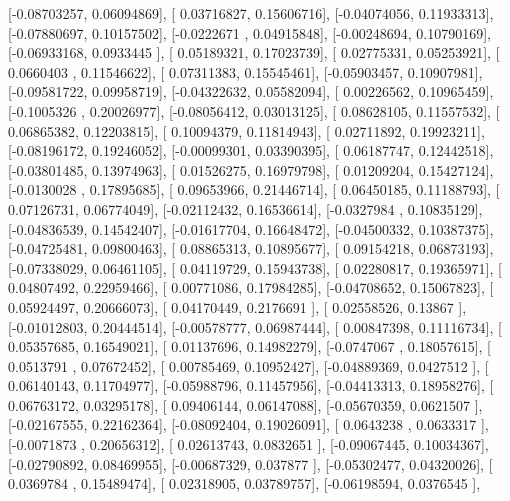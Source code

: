 \documentclass{article}
\begin{document}
       [-0.08703257,  0.06094869],
       [ 0.03716827,  0.15606716],
       [-0.04074056,  0.11933313],
       [-0.07880697,  0.10157502],
       [-0.0222671 ,  0.04915848],
       [-0.00248694,  0.10790169],
       [-0.06933168,  0.0933445 ],
       [ 0.05189321,  0.17023739],
       [ 0.02775331,  0.05253921],
       [ 0.0660403 ,  0.11546622],
       [ 0.07311383,  0.15545461],
       [-0.05903457,  0.10907981],
       [-0.09581722,  0.09958719],
       [-0.04322632,  0.05582094],
       [ 0.00226562,  0.10965459],
       [-0.1005326 ,  0.20026977],
       [-0.08056412,  0.03013125],
       [ 0.08628105,  0.11557532],
       [ 0.06865382,  0.12203815],
       [ 0.10094379,  0.11814943],
       [ 0.02711892,  0.19923211],
       [-0.08196172,  0.19246052],
       [-0.00099301,  0.03390395],
       [ 0.06187747,  0.12442518],
       [-0.03801485,  0.13974963],
       [ 0.01526275,  0.16979798],
       [ 0.01209204,  0.15427124],
       [-0.0130028 ,  0.17895685],
       [ 0.09653966,  0.21446714],
       [ 0.06450185,  0.11188793],
       [ 0.07126731,  0.06774049],
       [-0.02112432,  0.16536614],
       [-0.0327984 ,  0.10835129],
       [-0.04836539,  0.14542407],
       [-0.01617704,  0.16648472],
       [-0.04500332,  0.10387375],
       [-0.04725481,  0.09800463],
       [ 0.08865313,  0.10895677],
       [ 0.09154218,  0.06873193],
       [-0.07338029,  0.06461105],
       [ 0.04119729,  0.15943738],
       [ 0.02280817,  0.19365971],
       [ 0.04807492,  0.22959466],
       [ 0.00771086,  0.17984285],
       [-0.04708652,  0.15067823],
       [ 0.05924497,  0.20666073],
       [ 0.04170449,  0.2176691 ],
       [ 0.02558526,  0.13867   ],
       [-0.01012803,  0.20444514],
       [-0.00578777,  0.06987444],
       [ 0.00847398,  0.11116734],
       [ 0.05357685,  0.16549021],
       [ 0.01137696,  0.14982279],
       [-0.0747067 ,  0.18057615],
       [ 0.0513791 ,  0.07672452],
       [ 0.00785469,  0.10952427],
       [-0.04889369,  0.0427512 ],
       [ 0.06140143,  0.11704977],
       [-0.05988796,  0.11457956],
       [-0.04413313,  0.18958276],
       [ 0.06763172,  0.03295178],
       [ 0.09406144,  0.06147088],
       [-0.05670359,  0.0621507 ],
       [-0.02167555,  0.22162364],
       [-0.08092404,  0.19026091],
       [ 0.0643238 ,  0.0633317 ],
       [-0.0071873 ,  0.20656312],
       [ 0.02613743,  0.0832651 ],
       [-0.09067445,  0.10034367],
       [-0.02790892,  0.08469955],
       [-0.00687329,  0.037877  ],
       [-0.05302477,  0.04320026],
       [ 0.0369784 ,  0.15489474],
       [ 0.02318905,  0.03789757],
       [-0.06198594,  0.0376545 ],
\end{document}
